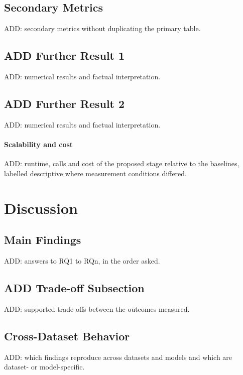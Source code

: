 \documentclass[final,5p,twocolumn]{elsarticle}
\begin{document}
\subsection{Secondary Metrics}
\label{subsec:secondary_results}
ADD: secondary metrics without duplicating the primary table.

\subsection{ADD Further Result 1}
\label{subsec:further_result_1}
ADD: numerical results and factual interpretation.

\subsection{ADD Further Result 2}
\label{subsec:further_result_2}
ADD: numerical results and factual interpretation.

\paragraph{Scalability and cost}
ADD: runtime, calls and cost of the proposed stage relative to the baselines, labelled descriptive where measurement conditions differed.


\section{Discussion}
\label{sec:discussion}

\subsection{Main Findings}
\label{subsec:main_findings}
ADD: answers to RQ1 to RQn, in the order asked.

\subsection{ADD Trade-off Subsection}
\label{subsec:tradeoffs}
ADD: supported trade-offs between the outcomes measured.

\subsection{Cross-Dataset Behavior}
\label{subsec:cross_dataset}
ADD: which findings reproduce across datasets and models and which are dataset- or model-specific.
\end{document}
